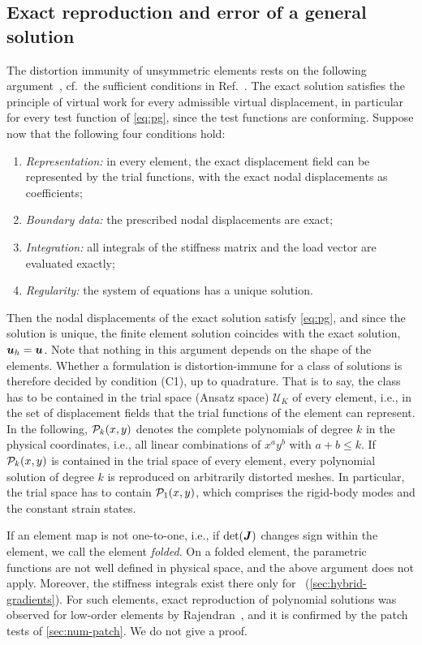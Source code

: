 \subsection{Exact reproduction and error of a general solution}
\label{sec:exact}
%
The distortion immunity of unsymmetric elements rests on the following argument~\cite{Eisentraeger2026axisymmetric}, cf.\ the sufficient conditions in Ref.~\cite{Rajendran2010technique}. The exact solution satisfies the principle of virtual work for every admissible virtual displacement, in particular for every test function of \cref{eq:pg}, since the test functions are conforming. Suppose now that the following four conditions hold:
\begin{enumerate}
  \item[(C1)] \emph{Representation:} in every element, the exact displacement field can be represented by the trial functions, with the exact nodal displacements as coefficients;
  \item[(C2)] \emph{Boundary data:} the prescribed nodal displacements are exact;
  \item[(C3)] \emph{Integration:} all integrals of the stiffness matrix and the load vector are evaluated exactly;
  \item[(C4)] \emph{Regularity:} the system of equations has a unique solution.
\end{enumerate}
Then the nodal displacements of the exact solution satisfy \cref{eq:pg}, and since the solution is unique, the finite element solution coincides with the exact solution, $\bm{u}_h=\bm{u}$. Note that nothing in this argument depends on the shape of the elements. Whether a formulation is distortion-immune for a class of solutions is therefore decided by condition (C1), up to quadrature. That is to say, the class has to be contained in the trial space (Ansatz space) $\mathcal U_K$ of every element, i.e., in the set of displacement fields that the trial functions of the element can represent. In the following, $\mathcal P_k(x,y)$ denotes the complete polynomials of degree $k$ in the physical coordinates, i.e., all linear combinations of $x^ay^b$ with $a+b\le k$. If $\mathcal P_k(x,y)$ is contained in the trial space of every element, every polynomial solution of degree $k$ is reproduced on arbitrarily distorted meshes. In particular, the trial space has to contain $\mathcal P_1(x,y)$, which comprises the rigid-body modes and the constant strain states.

If an element map is not one-to-one, i.e., if $\det(\bm{J})$ changes sign within the element, we call the element \emph{folded}. On a folded element, the parametric functions are not well defined in physical space, and the above argument does not apply. Moreover, the stiffness integrals exist there only for \PM\ (\cref{sec:hybrid-gradients}). For such elements, exact reproduction of polynomial solutions was observed for low-order elements by Rajendran~\cite{Rajendran2010technique}, and it is confirmed by the patch tests of \cref{sec:num-patch}. We do not give a proof.

